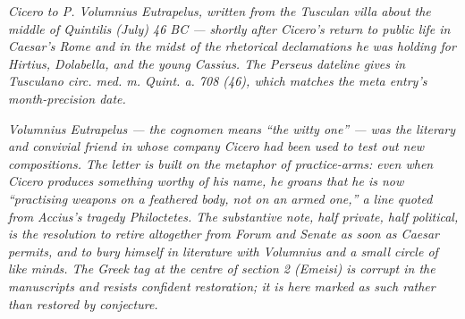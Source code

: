 
\textit{Cicero to P. Volumnius Eutrapelus, written from the
Tusculan villa about the middle of Quintilis (July) 46 BC ---
shortly after Cicero's return to public life in Caesar's Rome and
in the midst of the rhetorical declamations he was holding for
Hirtius, Dolabella, and the young Cassius. The Perseus dateline
gives \textit{in Tusculano circ. med. m. Quint. a. 708 (46)}, which
matches the meta entry's month-precision date.}

\textit{Volumnius Eutrapelus --- the cognomen means ``the witty one''
--- was the literary and convivial friend in whose company Cicero
had been used to test out new compositions. The letter is built on
the metaphor of practice-arms: even when Cicero produces something
worthy of his name, he groans that he is now ``practising weapons
on a feathered body, not on an armed one,'' a line quoted from
Accius's tragedy \textit{Philoctetes}. The substantive note, half
private, half political, is the resolution to retire altogether
from Forum and Senate as soon as Caesar permits, and to bury
himself in literature with Volumnius and a small circle of like
minds. The Greek tag at the centre of section 2 (\textit{Emeisi})
is corrupt in the manuscripts and resists confident restoration;
it is here marked as such rather than restored by conjecture.}

